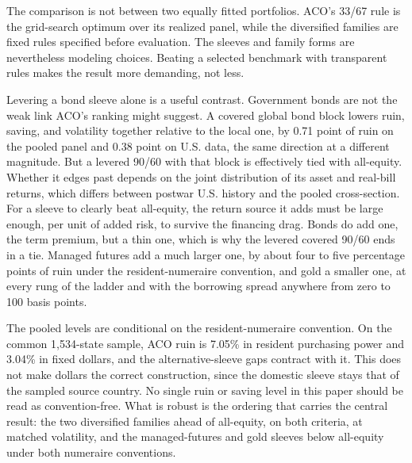 \documentclass[11pt]{article}
\begin{document}
The comparison is not between two equally fitted portfolios. ACO's 33/67 rule
is the grid-search optimum over its realized panel, while the diversified
families are fixed rules specified before evaluation. The
sleeves and family forms are nevertheless modeling choices. Beating a selected
benchmark with transparent rules makes the result more demanding, not less.

Levering a bond sleeve alone is a useful contrast. Government bonds are not the
weak link ACO's ranking might suggest. A covered global bond block lowers ruin,
saving, and volatility together relative to the local one, by 0.71 point of
ruin on the pooled panel and 0.38 point on U.S. data, the same direction at a
different magnitude. But a levered 90/60 with that block is effectively
tied with all-equity. Whether it edges past depends on the joint distribution
of its asset and real-bill returns, which differs between postwar U.S. history
and the pooled cross-section. For a
sleeve to clearly beat all-equity, the return source it adds must be large
enough, per unit of added risk, to survive the financing drag. Bonds do add
one, the term premium, but a thin one, which is why the levered covered 90/60
ends in a tie. Managed futures add a much larger one, by about four to
five percentage points of ruin under the resident-numeraire convention, and
gold a smaller one, at every rung of the ladder and with the borrowing
spread anywhere from zero to 100 basis points.

The pooled levels are conditional on the resident-numeraire convention. On the
common 1{,}534-state sample, ACO ruin is 7.05\% in resident purchasing power and
3.04\% in fixed dollars, and the alternative-sleeve gaps contract with it. This
does not make dollars the correct construction, since the domestic sleeve stays
that of the sampled source country. No single ruin or saving level in
this paper should be read as convention-free. What is robust is the ordering
that carries the central result: the two diversified families ahead of
all-equity, on both criteria, at matched volatility, and the managed-futures
and gold sleeves below all-equity under both numeraire conventions.
\end{document}
